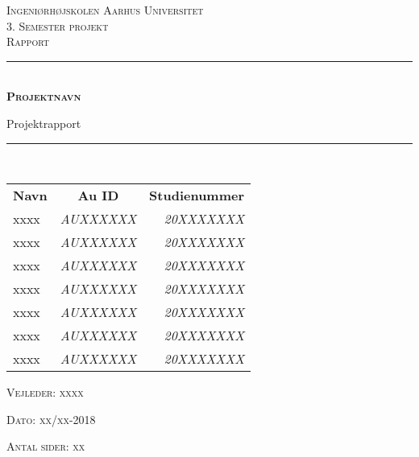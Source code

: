 \thispagestyle{empty}
\newcommand{\HRule}{\rule{\linewidth}{0.1mm}} %

\begin{center}
	\vspace{3cm}
	\textsc{\LARGE Ingeniørhøjskolen Aarhus Universitet}\\[1.5cm] %
	
	\textsc{\large 3. Semester projekt \\Rapport}\\[2.5cm] 
	
	\HRule \\[0.8cm]
	{\huge \bfseries \textsc{Projektnavn}} 

	{\LARGE Projektrapport} \\[0.4cm]
	\HRule \\[1.5cm]
	

	
	
	\vspace{0.5 in}
	\begin{center}
		\begin{tabular}{l c r}
			\textbf{Navn} & \textbf{Au ID} & \textbf{Studienummer} \\
			xxxx & \textsl{AUXXXXXX} & \textsl{20XXXXXXX}  \\
			xxxx & \textsl{AUXXXXXX} & \textsl{20XXXXXXX}  \\
			xxxx & \textsl{AUXXXXXX} & \textsl{20XXXXXXX}  \\
			xxxx & \textsl{AUXXXXXX} & \textsl{20XXXXXXX}  \\
			xxxx & \textsl{AUXXXXXX} & \textsl{20XXXXXXX}  \\
			xxxx & \textsl{AUXXXXXX} & \textsl{20XXXXXXX}  \\
			xxxx & \textsl{AUXXXXXX} & \textsl{20XXXXXXX}  \\
			
			
		\end{tabular}
	\end{center}
	\vspace{0.5 in}
	
	\textsc{\large Vejleder: xxxx}
	\vspace{0.5 in}
	
	\textsc{\large Dato: xx/xx-2018}\\
	\vspace{0.5 in}
	

\textsc{Antal sider: xx} \\
\vfill %
	
\end{center} %

\clearpage

\newpage